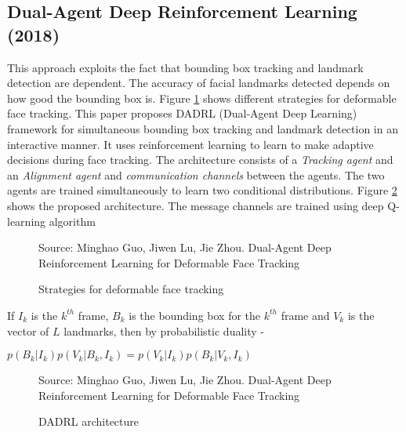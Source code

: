 \documentclass{llncs}
\begin{document}
\subsection{Dual-Agent Deep Reinforcement Learning (2018) \cite{dadrl}}

This approach exploits the fact that bounding box tracking and landmark detection are dependent. The accuracy of facial landmarks detected depends on how good the bounding box is.
Figure \ref{deformable_face_tracking} shows different strategies for deformable face tracking. This paper proposes DADRL (Dual-Agent Deep Learning) framework for simultaneous bounding box tracking and landmark detection in an interactive manner. It uses reinforcement learning to learn to make adaptive decisions during face tracking. The architecture consists of a \textit{Tracking agent} and an \textit{Alignment agent} and \textit{communication channels} between the agents. The two agents are trained simultaneously to learn two conditional distributions. Figure \ref{dadrl_architecture} shows the proposed architecture. The message channels are trained using deep Q-learning algorithm\\

\begin{figure}
%
{Source: Minghao Guo, Jiwen Lu, Jie Zhou. Dual-Agent Deep Reinforcement Learning for Deformable Face Tracking}
\caption{Strategies for deformable face tracking}
\label{deformable_face_tracking}
\end{figure}

If $I_k$ is the $k^{th}$ frame, $B_k$ is the bounding box for the $k^{th}$ frame and $V_k$ is the vector of $L$ landmarks, then by probabilistic duality -  

$p\left(B_{k} | I_{k}\right) p\left(V_{k} | B_{k}, I_{k}\right)=p\left(V_{k} | I_{k}\right) p\left(B_{k} | V_{k}, I_{k}\right)$\\

\begin{figure}
%
{Source: Minghao Guo, Jiwen Lu, Jie Zhou. Dual-Agent Deep Reinforcement Learning for Deformable Face Tracking}
\caption{DADRL architecture}
\label{dadrl_architecture}
\end{figure}
\end{document}
